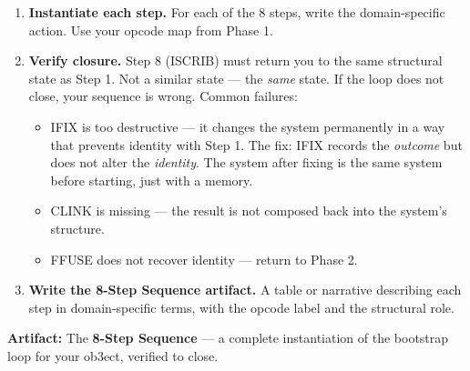 \documentclass[12pt,a4paper]{article}
\begin{document}
\begin{enumerate}[label=\textbf{4.\arabic*.}, leftmargin=2em]
\item \textbf{Instantiate each step.} For each of the 8 steps, write the domain-specific
    action. Use your opcode map from Phase 1.

\item \textbf{Verify closure.} Step 8 (ISCRIB) must return you to the same structural
    state as Step 1. Not a similar state — the \emph{same} state. If the loop does not
    close, your sequence is wrong. Common failures:
    \begin{itemize}
    \item IFIX is too destructive — it changes the system permanently in a way that
        prevents identity with Step 1. The fix: IFIX records the \emph{outcome} but
        does not alter the \emph{identity}. The system after fixing is the same system
        before starting, just with a memory.
    \item CLINK is missing — the result is not composed back into the system's structure.
    \item FFUSE does not recover identity — return to Phase 2.
    \end{itemize}

\item \textbf{Write the 8-Step Sequence artifact.} A table or narrative describing
    each step in domain-specific terms, with the opcode label and the structural role.
\end{enumerate}

{\bf Artifact:} The \textbf{8-Step Sequence} — a complete instantiation of the
bootstrap loop for your ob3ect, verified to close.
\end{document}
